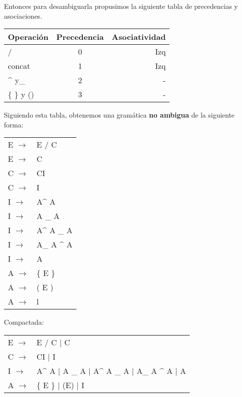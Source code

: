 Entonces para desambiguarla propusimos la siguiente tabla de precedencias y asociaciones.

\begin{center}
  \begin{tabular}{| l | c | r |}
    \hline
    Operaci\'on & Precedencia & Asociatividad \\ \hline
    / & 0 & Izq \\ \hline
    concat & 1 & Izq \\ \hline
    \^{} y\_ & 2& - \\ \hline
    \{ \} y () & 3 & - \\ 
    \hline
  \end{tabular}
\end{center}

Siguiendo esta tabla, obtenemos una gram\'atica \textbf{no ambigua} de la siguiente forma:

\begin{center}
\begin{tabular}{ l  l }
  E $\rightarrow$  & E / C \\
  E $\rightarrow$  &  C \\
  C $\rightarrow$  &  CI \\
  C $\rightarrow$  &  I  \\
  I $\rightarrow$  &  A\^{} A \\
  I $\rightarrow$  &  A \_ A \\
  I $\rightarrow$  &  A\^{} A \_ A \\
  I $\rightarrow$  &  A\_ A \^{} A \\
  I $\rightarrow$  &  A \\
  A $\rightarrow$ &  \{ E \} \\
  A $\rightarrow$ &  ( E ) \\
  A $\rightarrow$ &  l \\
\end{tabular}
\end{center}

Compactada:

\begin{center}
\begin{tabular}{ l  l }
  E $\rightarrow$  & E / C | C\\
  C $\rightarrow$  &  CI | I\\
  I $\rightarrow$  &  A\^{} A |  A \_ A  | A\^{} A \_ A | A\_ A \^{} A | A\\
  A $\rightarrow$ &  \{ E \} | (E) | I\\
\end{tabular}
\end{center}
